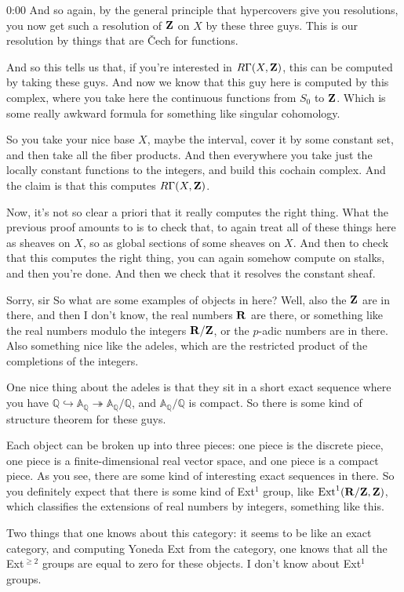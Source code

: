 \begin{unfinished}{0:00}
And so again, by the general principle that hypercovers give you resolutions, you now get such a resolution of $\mathbf Z$ on $X$ by these three guys. This is our resolution by things that are Čech for functions.

And so this tells us that, if you're interested in $R\Gamma(X, \mathbf Z)$, this can be computed by taking these guys. And now we know that this guy here is computed by this complex, where you take here the continuous functions from $S_0$ to $\mathbf Z$. Which is some really awkward formula for something like singular cohomology.

So you take your nice base $X$, maybe the interval, cover it by some constant set, and then take all the fiber products. And then everywhere you take just the locally constant functions to the integers, and build this cochain complex. And the claim is that this computes $R\Gamma(X, \mathbf Z)$. 

Now, it's not so clear a priori that it really computes the right thing. What the previous proof amounts to is to check that, to again treat all of these things here as sheaves on $X$, so as global sections of some sheaves on $X$. And then to check that this computes the right thing, you can again somehow compute on stalks, and then you're done. And then we check that it resolves the constant sheaf.

Sorry, sir
So what are some examples of objects in here? Well, also the $\mathbf Z$ are in there, and then I don't know, the real numbers $\mathbf R$ are there, or something like the real numbers modulo the integers $\mathbf R/\mathbf Z$, or the $p$-adic numbers are in there. Also something nice like the adeles, which are the restricted product of the completions of the integers.

One nice thing about the adeles is that they sit in a short exact sequence where you have $\mathbb{Q}\hookrightarrow\mathbb{A}_{\mathbb{Q}}\twoheadrightarrow\mathbb{A}_{\mathbb{Q}}/\mathbb{Q}$, and $\mathbb{A}_{\mathbb{Q}}/\mathbb{Q}$ is compact. So there is some kind of structure theorem for these guys.

Each object can be broken up into three pieces: one piece is the discrete piece, one piece is a finite-dimensional real vector space, and one piece is a compact piece. As you see, there are some kind of interesting exact sequences in there. So you definitely expect that there is some kind of Ext$^1$ group, like $\operatorname{Ext}^1(\mathbf R/\mathbf Z,\mathbf Z)$, which classifies the extensions of real numbers by integers, something like this.

Two things that one knows about this category: it seems to be like an exact category, and computing Yoneda Ext from the category, one knows that all the Ext$^{\ge 2}$ groups are equal to zero for these objects. I don't know about Ext$^1$ groups.


\end{unfinished}
